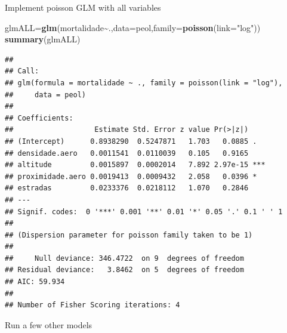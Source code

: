 \documentclass[
]{book}
\newenvironment{Shaded}{\begin{snugshade}}{\end{snugshade}}
\newcommand{\AttributeTok}[1]{\textcolor[rgb]{0.13,0.29,0.53}{#1}}
\newcommand{\FunctionTok}[1]{\textcolor[rgb]{0.13,0.29,0.53}{\textbf{#1}}}
\newcommand{\NormalTok}[1]{#1}
\newcommand{\OtherTok}[1]{\textcolor[rgb]{0.56,0.35,0.01}{#1}}
\newcommand{\SpecialCharTok}[1]{\textcolor[rgb]{0.81,0.36,0.00}{\textbf{#1}}}
\newcommand{\StringTok}[1]{\textcolor[rgb]{0.31,0.60,0.02}{#1}}
\begin{document}
Implement poisson GLM with all variables

\begin{Shaded}
\begin{Highlighting}[]
\NormalTok{glmALL}\OtherTok{=}\FunctionTok{glm}\NormalTok{(mortalidade}\SpecialCharTok{\textasciitilde{}}\NormalTok{.,}\AttributeTok{data=}\NormalTok{peol,}\AttributeTok{family=}\FunctionTok{poisson}\NormalTok{(}\AttributeTok{link=}\StringTok{"log"}\NormalTok{))}
\FunctionTok{summary}\NormalTok{(glmALL)}
\end{Highlighting}
\end{Shaded}

\begin{verbatim}
## 
## Call:
## glm(formula = mortalidade ~ ., family = poisson(link = "log"), 
##     data = peol)
## 
## Coefficients:
##                   Estimate Std. Error z value Pr(>|z|)    
## (Intercept)      0.8938290  0.5247871   1.703   0.0885 .  
## densidade.aero   0.0011541  0.0110039   0.105   0.9165    
## altitude         0.0015897  0.0002014   7.892 2.97e-15 ***
## proximidade.aero 0.0019413  0.0009432   2.058   0.0396 *  
## estradas         0.0233376  0.0218112   1.070   0.2846    
## ---
## Signif. codes:  0 '***' 0.001 '**' 0.01 '*' 0.05 '.' 0.1 ' ' 1
## 
## (Dispersion parameter for poisson family taken to be 1)
## 
##     Null deviance: 346.4722  on 9  degrees of freedom
## Residual deviance:   3.8462  on 5  degrees of freedom
## AIC: 59.934
## 
## Number of Fisher Scoring iterations: 4
\end{verbatim}

Run a few other models
\end{document}
